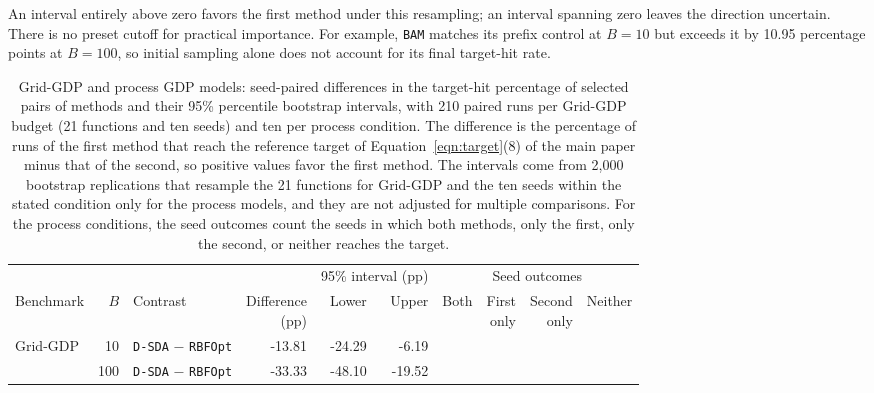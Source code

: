 An interval entirely above zero favors the first method under this resampling; an interval spanning zero leaves the direction uncertain.
There is no preset cutoff for practical importance.
For example, \texttt{BAM} matches its prefix control at \(B=10\) but exceeds it by 10.95 percentage points at \(B=100\), so initial sampling alone does not account for its final target-hit rate.

\begin{table}[htbp]
\centering
\caption{Grid-GDP and process GDP models: seed-paired differences in the target-hit percentage of selected pairs of methods and their 95\% percentile bootstrap intervals, with 210 paired runs per Grid-GDP budget (21 functions and ten seeds) and ten per process condition.
The difference is the percentage of runs of the first method that reach the reference target of Equation~\ifdefined\manuscriptwithsupplement\eqref{eqn:target}\else(8)\fi{} of the main paper minus that of the second, so positive values favor the first method.
The intervals come from 2,000 bootstrap replications that resample the 21 functions for Grid-GDP and the ten seeds within the stated condition only for the process models, and they are not adjusted for multiple comparisons.
For the process conditions, the seed outcomes count the seeds in which both methods, only the first, only the second, or neither reaches the target.}
\label{tab:supp-paired-differences}
\footnotesize
\setlength{\tabcolsep}{3.5pt}
\begin{threeparttable}
\begin{tabular}{@{}lrlrrrrrrr@{}}\toprule
 & & & & \multicolumn{2}{c}{95\% interval (pp)} & \multicolumn{4}{c}{Seed outcomes}\\\cmidrule(lr){5-6}\cmidrule(l){7-10}
Benchmark & \(B\) & Contrast & \makecell{Difference\\(pp)} & Lower & Upper & Both & \makecell{First\\only} & \makecell{Second\\only} & Neither\\\midrule
\multirow{8}{*}{Grid-GDP} & 10 & \texttt{D-SDA} \(-\) \texttt{RBFOpt} & -13.81 & -24.29 & -6.19 & & & & \\
 & 100 & \texttt{D-SDA} \(-\) \texttt{RBFOpt} & -33.33 & -48.10 & -19.52 & & & & \\

\end{tabular}
\end{threeparttable}
\end{table}
